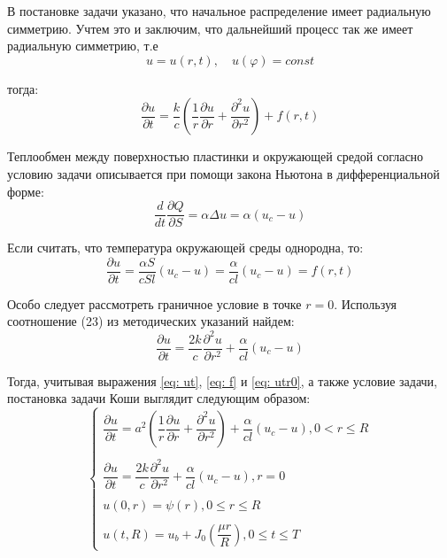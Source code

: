 \documentclass[a4paper,14pt,russian, leqno, fleqn]{extreport}
\begin{document}
	В постановке задачи указано, что начальное распределение имеет радиальную симметрию. Учтем это и заключим, что дальнейший процесс так же имеет радиальную симметрию, т.е 
	\begin{equation}
	u = u(r,t), \quad u(\varphi) = const	
	\end{equation}
	
	тогда:	
	\begin{equation}
	\dfrac{\partial u}{\partial t} = \dfrac{k}{c} \left ( \dfrac{1}{r}\dfrac{\partial u}{\partial r} + \dfrac{\partial^2 u}{\partial r^2}\right ) + f(r,t)
	\label{eq: ut}
	\end{equation}
	
	Теплообмен между поверхностью пластинки и окружающей средой согласно условию задачи описывается при помощи закона Ньютона в дифференциальной форме:	
	\begin{equation}
	\dfrac{d}{dt}\dfrac{\partial Q}{\partial S} = \alpha \Delta u  = \alpha (u_c - u)
	\end{equation}
	
	Если считать, что температура окружающей среды однородна, то:	
	\begin{equation}
	\dfrac{\partial u}{\partial t} = \dfrac{\alpha S}{cSl}(u_c - u) = \dfrac{\alpha}{cl}(u_c - u) = f(r,t)
	\label{eq: f}
	\end{equation}
	
	Особо следует рассмотреть граничное условие в точке $r = 0$. Используя соотношение (23) из методических указаний найдем:	
	\begin{equation}
	\dfrac{\partial u}{\partial t} = \dfrac{2k}{c} \dfrac{\partial^2 u}{\partial r^2} + \dfrac{\alpha}{cl}(u_c - u)
	\label{eq: utr0}
	\end{equation}
	
	Тогда, учитывая выражения \eqref{eq: ut}, \eqref{eq: f} и \eqref{eq: utr0}, а также условие задачи, постановка задачи Коши выглядит следующим образом:	
	\begin{equation}
	\left \{
	\begin{array}{l}
	\dfrac{\partial u}{\partial t} = a^2 \left ( \dfrac{1}{r}\dfrac{\partial u}{\partial r} + \dfrac{\partial^2 u}{\partial r^2}\right ) + \dfrac{\alpha}{cl}(u_c - u), 0 < r \leq R\\
	\\
	\dfrac{\partial u}{\partial t} = \dfrac{2k}{c} \dfrac{\partial^2 u}{\partial r^2} + \dfrac{\alpha}{cl}(u_c - u), r = 0 \\
	\\
	u(0,r) = \psi(r), 0 \leq r \leq R \\
	\\
	u(t, R) = u_b + J_0\left(\dfrac{\mu r}{R}\right), 0 \leq t \leq T
	\end{array}
	\right.
	\label{eq: koschi_task}
	\end{equation}
\end{document}
